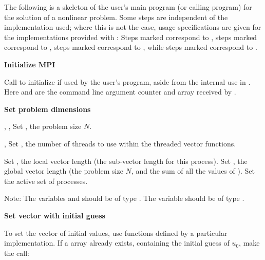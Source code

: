 The following is a skeleton of the user's main program (or calling
program) for the solution of a nonlinear problem. 
Some steps are independent of the {\nvector} implementation used; 
where this is not the case, usage specifications are given for the implementations 
provided with {\kinsol}: Steps marked {\p} correspond to 
{\nvecp}, steps marked {\omp} correspond to {\nvecopenmp}, steps
marked {\pt} correspond to {\nvecpthreads}, while steps marked {\s}
correspond to {\nvecs}.
\begin{Steps}
  
\item 
  {\bf {\p} Initialize MPI}

  Call  to initialize {\mpi} if used by
  the user's program, aside from the internal use in {\nvecp}.  
  Here  and  are the command line argument 
  counter and array received by .
  
\item
  {\bf Set problem dimensions}

  {\s, \omp, \pt} Set , the problem size $N$.

  {\omp, \pt} Set , the number of threads to use within
  the threaded vector functions.

  {\p} Set , the local vector length (the sub-vector length for this process).
  Set , the global vector length (the problem size $N$, and the sum of all the
  values of ).  Set the active set of processes.

  Note: The variables  and  should be of type
  .  The variable  should be of type .

\item
  {\bf Set vector with initial guess}
 
  To set the vector  of initial values, use functions defined by a
  particular {\nvector} implementation.  If a  array  
  already exists, containing the initial guess of $u_0$, make the call:

  {\s} 

  {\omp} 

  {\pt} 

  {\p} 


\end{Steps}

